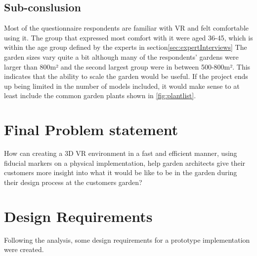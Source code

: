 	\subsection{Sub-conslusion}
	Most of the questionnaire respondents are familiar with VR and felt comfortable using it. The group that expressed most comfort with it were aged 36-45, which is within the age group defined by the experts in section\autoref{sec:expertInterviews}
	The garden sizes vary quite a bit although many of the respondents' gardens were larger than 800m² and the second largest group were in between 500-800m². This indicates that the ability to scale the garden would be useful. If the project ends up being limited in the number of models included, it would make sense to at least include the common garden plants shown in \autoref{fig:plantlist}.

\section{Final Problem statement}\label{sec:FPS}
How can creating a 3D VR environment in a fast and efficient manner, using fiducial markers on a physical implementation, help garden architects give their customers more insight into what it would be like to be in the garden during their design process at the customers garden?
			
			\section{Design Requirements}\label{sec:designRequirements}
			Following the analysis, some design requirements for a prototype implementation were created.
